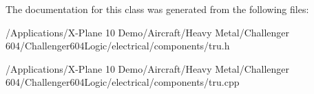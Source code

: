 The documentation for this class was generated from the following files\-:\begin{DoxyCompactItemize}
\item 
/\-Applications/\-X-\/\-Plane 10 Demo/\-Aircraft/\-Heavy Metal/\-Challenger 604/\-Challenger604\-Logic/electrical/components/tru.\-h\item 
/\-Applications/\-X-\/\-Plane 10 Demo/\-Aircraft/\-Heavy Metal/\-Challenger 604/\-Challenger604\-Logic/electrical/components/tru.\-cpp\end{DoxyCompactItemize}
